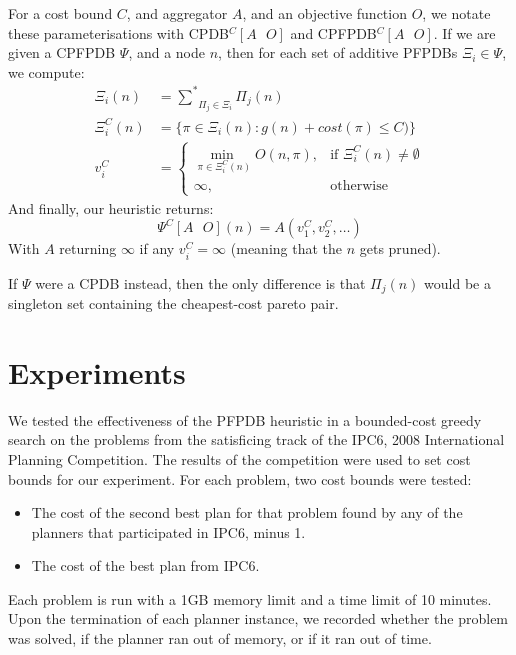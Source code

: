 \documentclass[letterpaper]{article} %
\begin{document}
For a cost bound \(C\), and aggregator \(A\), and an objective function \(O\), we notate these parameterisations with CPDB\(^C[A \text{ } O]\) and CPFPDB\(^C[A \text{ } O]\).
If we are given a CPFPDB \(\Psi\), and a node \(n\),
then for each set of additive PFPDBs \(\Xi_i \in \Psi\), we compute:
\begin{align*}
\Xi_i(n) &= \underset{\Pi_{j} \in \Xi_i}{{\sum}^*} \Pi_{j}(n) \\
\Xi^C_i(n) &= \{\pi \in \Xi_i(n) : g(n) + cost(\pi) \leq C)\} \\
v^C_i &=  
\begin{cases}
  \underset{\pi \in \Xi^C_i(n)}{\operatorname{min\ }} O(n, \pi),& \text{if } \Xi^C_i(n) \not = \emptyset \\
  \infty, & \text{otherwise}
\end{cases}
\end{align*}
  And finally, our heuristic returns:
\[\Psi^C[A \text{ } O](n) = A(v^C_1, v^C_2, \ldots)\]
With \(A\) returning \(\infty\) if any \(v^C_i = \infty\) (meaning that the \(n\) gets pruned).

If \(\Psi\) were a CPDB instead, then the only difference is that
\(\Pi_{j}(n)\) would be a singleton set containing the cheapest-cost pareto pair.

\section{Experiments}

We tested the effectiveness of the PFPDB heuristic in
a bounded-cost greedy search on the problems
from the satisficing track of the IPC6, 2008
International Planning Competition.
The results of the competition were used to set cost bounds for our experiment.
For each problem, two cost bounds were tested:
\begin{itemize}
\item
  The cost of the second best plan for that problem found by any of the planners that
  participated in IPC6, minus 1.
\item
  The cost of the best plan from IPC6.
\end{itemize}
Each problem is run with a 1GB memory limit and a
time limit of 10 minutes.
Upon the termination of each planner instance,
we recorded whether the problem was solved, if the planner ran
out of memory, or if it ran out of time.
\end{document}
